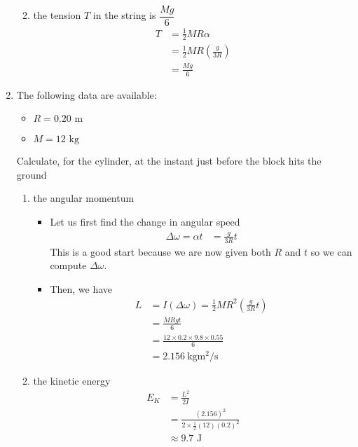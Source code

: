 \documentclass[a4paper,12pt]{article}
\begin{document}
\begin{enumerate}[label=(\alph*)]
\begin{enumerate}[label=(\roman*)]
\begin{itemize}
\begin{itemize}
                        \end{itemize}
                \end{itemize}
          \item the tension $T$ in the string is $\dfrac{Mg}{6}$
                \begin{align*}
                  T & = \frac{1}{2}MR\alpha                    \\
                    & = \frac{1}{2}MR\left(\frac{g}{3R}\right) \\
                    & = \frac{Mg}{6}
                \end{align*}
        \end{enumerate}
  \item The following data are available:
        \begin{itemize}
          \item $R =0.20 \text{ m}$
          \item $M = 12 \text{ kg}$
        \end{itemize}
        Calculate, for the cylinder, at the instant just before the block hits the ground
        \begin{enumerate}[label=(\roman*)]
          \item the angular momentum
                \begin{itemize}
                  \item Let us first find the change in angular speed
                        \begin{align*}
                          \Delta \omega = \alpha t & = \frac{g}{3R}t
                        \end{align*}
                        This is a good start because we are now given both $R$ and $t$ so we can compute $\Delta \omega$.
                  \item Then, we have
                        \begin{align*}
                          L & = I(\Delta \omega) = \frac{1}{2}MR^2(\frac{g}{3R}t) \\
                            & = \frac{MRgt}{6}                                    \\
                            & = \frac{12\times 0.2\times9.8\times0.55}{6}         \\
                            & = \SI{2.156}{\kg\m\squared\per\s}
                        \end{align*}

                \end{itemize}
          \item the kinetic energy
                \begin{align*}
                  E_K & = \frac{L^2}{2I}                                  \\
                      & = \frac{(2.156)^2}{2\times\frac{1}{2}(12)(0.2)^2} \\
                      & \approx 9.7 \text{ J}
                \end{align*}
        \end{enumerate}
\end{enumerate}
\end{document}

